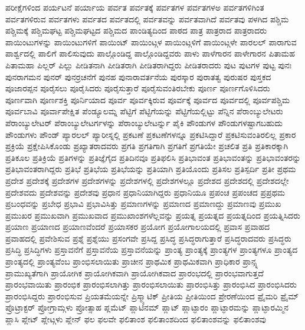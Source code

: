 {ಪರೀಕ್ಷೆಗಳಿಂದ
ಪರ್ಯಟನೆ
ಪರ್ಯಾಯ
ಪರ್ವತ
ಪರ್ವತಕ್ಕೆ
ಪರ್ವತಗಳ
ಪರ್ವತಗಳಅ
ಪರ್ವತಗಳಿಗಿಂತ
ಪರ್ವತಗಳಿರುವ
ಪರ್ವತಗಳು
ಪರ್ವತದ
ಪರ್ವತದಲ್ಲಿ
ಪರ್ವತವನ್ನು
ಪರ್ವತವಾಗಿದೆ
ಪರ್ವತವು
ಪಳಗಿದ
ಪಶ್ಚಿಮ
ಪಶ್ಚಿಮಕ್ಕೆ
ಪಶ್ಚಿಮಘಟ್ಟ
ಪಶ್ಚಿಮಘಟ್ಟದ
ಪಶ್ಚಿಮದ
ಪಾಂಡಿತ್ಯದಿಂದ
ಪಾಠದ
ಪಾತ್ರ
ಪಾತ್ರರಾದ
ಪಾತ್ರರಾದರು
ಪಾಯಿಂಟುಗಳನ್ನು
ಪಾಯಿಂಟುಗಳಿಗೆ
ಪಾಯಿಂಟ್
ಪಾಯಿಂಟ್ಗಳ
ಪಾಯಿಂಟ್ಗಳಿಗೆ
ಪಾಯಿಂಟ್ಗಳೇ
ಪಾರಲಲ್
ಪಾರಾಗುವ
ಪಾರ್ಶ್ವದಲ್ಲಿ
ಪಾಲಿಗೆ
ಪಾಲಿಸುವುದು
ಪಾಲ್ಗೊಂಡಿದ್ದ
ಪಾಲ್ಗೊಂಡಿದ್ದವರು
ಪಾಳು
ಪಾಳೆಗಾರನ
ಪಾಳೇಗಾರನ
ಪಿತಾಮಹ
ಪಿತಾಮಹಾ
ಪಿಲ್ಲರ್
ಪಿಲ್ಲು
ಪೀಡಿತನಾಗಿ
ಪೀಡಿತರಾಗಿ
ಪೀಡಿತರಾಗಿದ್ದರು
ಪೀಡಿತರಾದರು
ಪುಟ
ಪುಟಗಳ
ಪುಟ್ಟ
ಪುನಃ
ಪುನರಾಗಮನ
ಪುನರ್
ಪುನರ್ರಚನೆಗೆ
ಪುನಹ
ಪುನಾರಾವರ್ತನೆಯ
ಪುರಸ್ಕಾರ
ಪುರಾತತ್ವ
ಪುರುಷರ
ಪುಸ್ತಕದ
ಪೂಜಾರಪ್ಪನ
ಪೂರೈಸಲು
ಪೂರೈಸಿದರು
ಪೂರೈಸುತ್ತಾರೆ
ಪೂರೈಸುವಂತಿರಬೇಕು
ಪೂರ್ಣ
ಪೂರ್ಣಗೊಳಿಸಿದರು
ಪೂರ್ಣವಾಗಿ
ಪೂರ್ಣಶಕ್ತಿ
ಪೂರ್ನಿಯಾದ
ಪೂರ್ವ
ಪೂರ್ವಕ್ಕಿರುವ
ಪೂರ್ವಕ್ಕೆ
ಪೂರ್ವದ
ಪೂರ್ವದಲ್ಲಿ
ಪೂರ್ವಪಶ್ಚಿಮ
ಪೂರ್ವಬಾವಿ
ಪೂರ್ವಾಪೇಕ್ಷಿತ
ಪೆಂಡ್ಯೂಲಮ್ನ
ಪೆಟ್ಟಿಗೆ
ಪೆಟ್ಟಿಗೆಯನ್ನು
ಪೆಟ್ಟಿಗೆಯಲ್ಲಿಟ್ಟು
ಪೆನ್ನಿನ
ಪೆರಾಂಬ್ಯುಲೇಟರು
ಪೆರಾಂಬ್ಯುಲೇಟರ್
ಪೆರಾಂಬ್ಯುಲೇಟರ್ಗಳನ್ನು
ಪೆರಾಂಬ್ಯುಲೇಟರ್ನ್ನು
ಪೈಕಿ
ಪೌಂಡುಗಳ
ಪೌಂಡುಗಳಷ್ಟಾಗಬಹುದು
ಪೌಂಡುಗಳು
ಪೌಂಡ್
ಪ್ಯಾರಲಲ್
ಪ್ಯಾರೀಸ್ನಲ್ಲಿ
ಪ್ರಕಟಣೆ
ಪ್ರಕಟಣೆಗಳನ್ನೂ
ಪ್ರಕಟಿಸಿದ್ದಾರೆ
ಪ್ರಕಟಿಸುವಂತಿರಲಿಲ್ಲ
ಪ್ರಕಾರ
ಪ್ರಕ್ರಿಯೆ
ಪ್ರಕ್ಷೇಪಿಸಿಕೊಂಡು
ಪ್ರಖ್ಯಾತರಾದವರು
ಪ್ರಗತಿ
ಪ್ರಗತಿಗಾಗಿ
ಪ್ರಗತಿಗೆ
ಪ್ರಗತಿಯೇ
ಪ್ರಚಲಿತ
ಪ್ರತಿ
ಪ್ರತಿಕಾರಕ್ಕಾಗಿ
ಪ್ರತಿಕೂಲ
ಪ್ರತಿಕ್ರಿಯೆ
ಪ್ರತಿಗಳನ್ನು
ಪ್ರತಿಜ್ಞೆಗೈದ
ಪ್ರತಿದಿನವೂ
ಪ್ರತಿಫಲಿಸಿ
ಪ್ರತಿಭಾವಂತ
ಪ್ರತಿಭಾವಂತನ್ನು
ಪ್ರತಿಭಾವಂತರನ್ನು
ಪ್ರತಿಭಾವಂತರಾಗಿದ್ದರು
ಪ್ರತಿಭೆ
ಪ್ರತಿಭೆಯ
ಪ್ರತಿಭೆಯನ್ನು
ಪ್ರತಿಯಾಗಿ
ಪ್ರತಿಯೊಂದು
ಪ್ರತಿಸಲ
ಪ್ರತಿಸ್ಪರ್ದಿ
ಪ್ರತೀ
ಪ್ರಥಮ
ಪ್ರದೇಶ
ಪ್ರದೇಶಕ್ಕೆ
ಪ್ರದೇಶಗಳ
ಪ್ರದೇಶಗಳನ್ನು
ಪ್ರದೇಶಗಳಲ್ಲಿ
ಪ್ರದೇಶಗಳಲ್ಲೂ
ಪ್ರದೇಶದ
ಪ್ರದೇಶದಲ್ಲಿ
ಪ್ರದೇಶದಲ್ಲೇ
ಪ್ರದೇಶವದು
ಪ್ರದೇಶವನ್ನು
ಪ್ರದೇಶವು
ಪ್ರಧಾನ
ಪ್ರಧಾನಿಯಾಗಿದ್ದರು
ಪ್ರಧಾನಿಯೂ
ಪ್ರಪಂಚ
ಪ್ರಪಂಚದ
ಪ್ರಪ್ರಥಮ
ಪ್ರಬಂಧವನ್ನು
ಪ್ರಬೇಧ
ಪ್ರಭಾವಿ
ಪ್ರಭಾವಿಸಿತ್ತು
ಪ್ರಮಾಣಗಳನ್ನು
ಪ್ರಮಾಣದ
ಪ್ರಮಾಣದ್ದು
ಪ್ರಮಾಣವು
ಪ್ರಮುಖ
ಪ್ರಮುಖರ
ಪ್ರಮುಖವಾಗಿ
ಪ್ರಮುಖವಾದ
ಪ್ರಮುಖಾಂಶಗಳೆಲ್ಲವನ್ನು
ಪ್ರಯತ್ನ
ಪ್ರಯತ್ನದ
ಪ್ರಯತ್ನದಿಂದ
ಪ್ರಯತ್ನಿಸಿದರು
ಪ್ರಯಾಣ
ಪ್ರಯಾಣದ
ಪ್ರಯಾಣವೆಂದರೆ
ಪ್ರಯಾಸಕರ
ಪ್ರಯೋಗ
ಪ್ರಯೋಗಾಲಯದಲ್ಲಿ
ಪ್ರವಾಸ
ಪ್ರವಾಹದ
ಪ್ರವಾಹದಲ್ಲಿ
ಪ್ರವೇಶಿಸುವ
ಪ್ರಶ್ನೆ
ಪ್ರಶ್ನೆಯು
ಪ್ರಸಂಗವೇ
ಪ್ರಸಿದ್ದ
ಪ್ರಸಿದ್ಧ
ಪ್ರಸಿದ್ಧರಾಗುತ್ತಾರೆ
ಪ್ರಸಿದ್ಧರಾದವರು
ಪ್ರಸಿದ್ಧರು
ಪ್ರಸಿದ್ಧಿ
ಪ್ರಸಿದ್ಧಿಗಳು
ಪ್ರಸ್ತಾವನೆಗೆ
ಪ್ರಸ್ತಾವನೆಯ
ಪ್ರಸ್ತಾವನೆಯನ್ನು
ಪ್ರಾಂತ್ಯ
ಪ್ರಾಂತ್ಯಕ್ಕೆ
ಪ್ರಾಂತ್ಯಗಳ
ಪ್ರಾಂತ್ಯಗಳೂ
ಪ್ರಾಂತ್ಯದ
ಪ್ರಾಂತ್ಯದಲ್ಲಿ
ಪ್ರಾಂತ್ಯವೆಂಬ
ಪ್ರಾಂಭಿಸಲಾಯಿತು
ಪ್ರಾಚೀನ
ಪ್ರಾಥಮಿಕ
ಪ್ರಾಥಮಿಕವಾಗಿ
ಪ್ರಾಧಿಕಾರ
ಪ್ರಾನ್ಸ್ನ
ಪ್ರಾಮುಖ್ಯತೆಗಾಗಿ
ಪ್ರಾಯೋಗಿಕ
ಪ್ರಾಯೋಗಿಕವಾಗಿ
ಪ್ರಾಯೋಗಿಕವಾದ
ಪ್ರಾರಂಭದಲ್ಲಿ
ಪ್ರಾರಂಭವಾಗುತ್ತದೆ
ಪ್ರಾರಂಭವಾಯಿತು
ಪ್ರಾರಂಭಿಕ
ಪ್ರಾರಂಭಿಸಲಾಗಿತ್ತು
ಪ್ರಾರಂಭಿಸಲಾಯಿತು
ಪ್ರಾರಂಭಿಸಿತ್ತು
ಪ್ರಾರಂಭಿಸಿದ
ಪ್ರಾರಂಭಿಸಿದರು
ಪ್ರಾರಂಭಿಸಿದ್ದರು
ಪ್ರಾರಂಭಿಸುವ
ಪ್ರಿಯತಮೆಯನ್ನೇ
ಪ್ರಿಸ್ಮ್ಯಾಟಿಕ್
ಪ್ರೀತಿಯ
ಪ್ರೀತಿಯಿಂದ
ಪ್ರೇರಣೆಯಿಂದ
ಪ್ರೈಮರಿ
ಪ್ರೈಮ್
ಪ್ರೊಟ್ರಾಕ್ಟರ್
ಪ್ರೋಗ್ರಾಮ್ಗಳು
ಪ್ರೋತ್ಸಾಹ
ಪ್ಲಮೆಟ್
ಪ್ಲಾಟಿನಮ್
ಪ್ಲಾಟ್
ಪ್ಲಾಟ್ಫಾರಂ
ಪ್ಲಾಟ್ಫಾರಮನ್ನು
ಪ್ಲಾಟ್ಫಾರಮ್ಮಿನ
ಪ್ಲಾಸಿ
ಪ್ಲೇಟ್
ಪ್ಲೇಟ್ಗಳು
ಪ್ಲೇನ್
ಫಲ
ಫಲವೇ
ಫಲಿತಾಂಶ
ಫಲಿತಾಂಶದಿಂದ
ಫಲಿತಾಂಶವನ್ನು
ಫಲಿತಾಂಶವು
}

